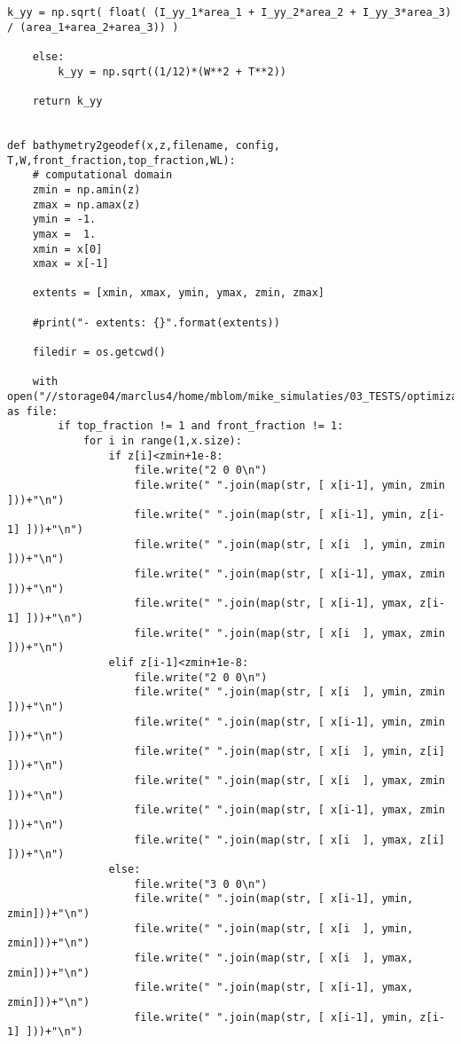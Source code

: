 \begin{mdframed}[backgroundcolor=light-gray, roundcorner=10pt,leftmargin=1, rightmargin=1, innerleftmargin=0, innertopmargin=7,innerbottommargin=0, outerlinewidth=1, linecolor=light-gray]
\begin{lstlisting}[linewidth=\columnwidth,caption=Functions used in setting up simulations ., label=script:setting up simulations]
        k_yy = np.sqrt( float( (I_yy_1*area_1 + I_yy_2*area_2 + I_yy_3*area_3) / (area_1+area_2+area_3)) )

    else:
        k_yy = np.sqrt((1/12)*(W**2 + T**2))

    return k_yy


def bathymetry2geodef(x,z,filename, config, T,W,front_fraction,top_fraction,WL):
    # computational domain
    zmin = np.amin(z)
    zmax = np.amax(z)
    ymin = -1.
    ymax =  1.
    xmin = x[0]
    xmax = x[-1]

    extents = [xmin, xmax, ymin, ymax, zmin, zmax]

    #print("- extents: {}".format(extents))

    filedir = os.getcwd()

    with open("//storage04/marclus4/home/mblom/mike_simulaties/03_TESTS/optimization_clusterfolder/ComFLOW_simulations/configuration_{}/input_files/breakwater_geometry.in".format(config),"w") as file:
        if top_fraction != 1 and front_fraction != 1:
            for i in range(1,x.size):
                if z[i]<zmin+1e-8:
                    file.write("2 0 0\n")
                    file.write(" ".join(map(str, [ x[i-1], ymin, zmin ]))+"\n")
                    file.write(" ".join(map(str, [ x[i-1], ymin, z[i-1] ]))+"\n")
                    file.write(" ".join(map(str, [ x[i  ], ymin, zmin ]))+"\n")
                    file.write(" ".join(map(str, [ x[i-1], ymax, zmin ]))+"\n")
                    file.write(" ".join(map(str, [ x[i-1], ymax, z[i-1] ]))+"\n")
                    file.write(" ".join(map(str, [ x[i  ], ymax, zmin ]))+"\n")
                elif z[i-1]<zmin+1e-8:
                    file.write("2 0 0\n")
                    file.write(" ".join(map(str, [ x[i  ], ymin, zmin ]))+"\n")
                    file.write(" ".join(map(str, [ x[i-1], ymin, zmin ]))+"\n")
                    file.write(" ".join(map(str, [ x[i  ], ymin, z[i] ]))+"\n")
                    file.write(" ".join(map(str, [ x[i  ], ymax, zmin ]))+"\n")
                    file.write(" ".join(map(str, [ x[i-1], ymax, zmin ]))+"\n")
                    file.write(" ".join(map(str, [ x[i  ], ymax, z[i] ]))+"\n")
                else:
                    file.write("3 0 0\n")
                    file.write(" ".join(map(str, [ x[i-1], ymin, zmin]))+"\n")
                    file.write(" ".join(map(str, [ x[i  ], ymin, zmin]))+"\n")
                    file.write(" ".join(map(str, [ x[i  ], ymax, zmin]))+"\n")
                    file.write(" ".join(map(str, [ x[i-1], ymax, zmin]))+"\n")
                    file.write(" ".join(map(str, [ x[i-1], ymin, z[i-1] ]))+"\n")

\end{lstlisting}
\end{mdframed}
